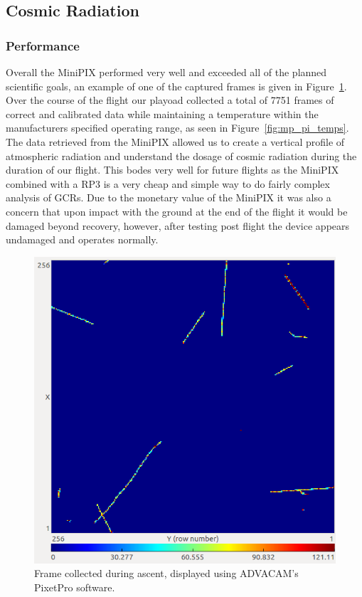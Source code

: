 \subsection{Cosmic Radiation}
\label{sec:Cosmic-Radiation-Results}
	
\subsubsection{Performance}

Overall the MiniPIX performed very well and exceeded all of the planned scientific goals, an example of one of the captured frames is given in Figure~\ref{fig:hits1}. Over the course of the flight our playoad collected a total of \num{7751} frames of correct and calibrated data while maintaining a temperature within the manufacturers specified operating range, as seen in Figure~\ref{fig:mp_pi_temps}. The data retrieved from the MiniPIX allowed us to create a vertical profile of atmospheric radiation and understand the dosage of cosmic radiation during the duration of our flight. This bodes very well for future flights as the MiniPIX combined with a RP3 is a very cheap and simple way to do fairly complex analysis of GCRs. Due to the monetary value of the MiniPIX it was also a concern that upon impact with the ground at the end of the flight it would be damaged beyond recovery, however, after testing post flight the device appears undamaged and operates normally. 

\begin{figure}[H]
\begin{center}
\includegraphics[width=.50\textwidth]{./Figures/flight_frame.png}
\caption{Frame collected during ascent, displayed using ADVACAM's PixetPro software.}
\label{fig:hits1}
\end{center}
\end{figure}

